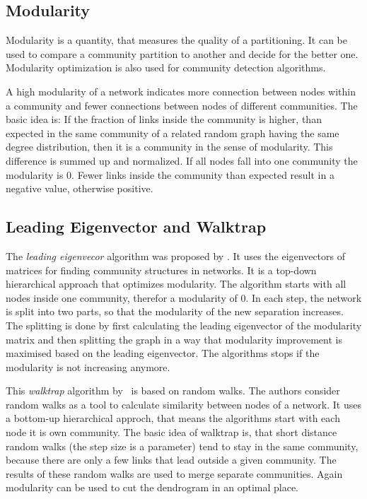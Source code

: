 \subsection{Modularity}
Modularity is a quantity, that measures the quality of a partitioning. It can be used to compare a community partition to another and decide for the better one. Modularity optimization is also used for community detection algorithms.

A high modularity of a network indicates more connection between nodes within a community and fewer connections between nodes of different communities. The basic idea is: If the fraction of links inside the community is higher, than expected in the same community of a related random graph having the same degree distribution, then it is a community in the sense of modularity. This difference is summed up and normalized. If all nodes fall into one community the modularity is $0$. Fewer links inside the community than expected result in a negative value, otherwise positive.


\subsection{Leading Eigenvector and Walktrap}
The \emph{leading eigenvecor} algorithm was proposed by \textcite{newman2006finding}. It uses the eigenvectors of matrices for finding community structures in networks. It is a top-down hierarchical approach that optimizes modularity. The algorithm starts with all nodes inside one community, therefor a modularity of 0. In each step, the network is split into two parts, so that the modularity of the new separation increases. The splitting is done by first calculating the leading eigenvector of the modularity matrix and then splitting the graph in a way that modularity improvement is maximised based on the leading eigenvector. The algorithms stops if the modularity is not increasing anymore.

This \emph{walktrap} algorithm by~\textcite{pons2005computing} is based on random walks. The authors consider random walks as a tool to calculate similarity between nodes of a network. It uses a bottom-up hierarchical approch, that means the algorithms start with each node it is own community. The basic idea of walktrap is, that short distance random walks (the step size is a parameter) tend to stay in the same community, because there are only a few links that lead outside a given community.
The results of these random walks are used to merge separate communities.
Again modularity can be used to cut the dendrogram in an optimal place.


